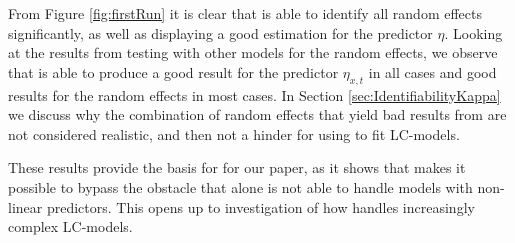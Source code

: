 From Figure \ref{fig:firstRun} it is clear that \inlabru is able to identify all random effects significantly, as well as displaying a good estimation for the predictor $\eta$. Looking at the results from testing \inlabru with other models for the random effects, we observe that \inlabru is able to produce a good result for the predictor $\eta_{x,t}$ in all cases and good results for the random effects in most cases. In Section \ref{sec:IdentifiabilityKappa} we discuss why the combination of random effects that yield bad results from \inlabru are not considered realistic, and then not a hinder for using \inlabru to fit LC-models. 

These results provide the basis for for our paper, as it shows that \inlabru makes it possible to bypass the obstacle that \inla alone is not able to handle models with non-linear predictors. This opens up to investigation of how \inlabru handles increasingly complex LC-models. 

